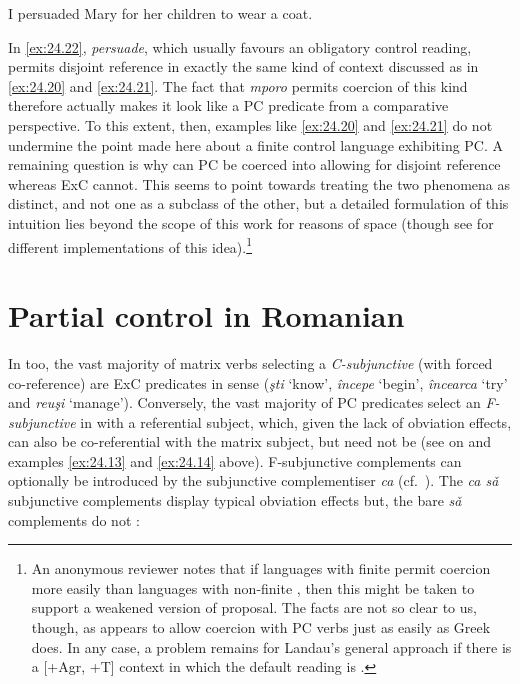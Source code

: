 \documentclass[output=paper]{langsci/langscibook}
\begin{document}
\ea%
    \label{ex:24.22}
    I persuaded Mary for her children to wear a coat.
\z

In \eqref{ex:24.22}, \emph{persuade}, which usually favours an obligatory
control reading, permits disjoint reference in exactly the same kind of context
discussed as in \eqref{ex:24.20} and \eqref{ex:24.21}. The fact that
\emph{mporo} permits coercion of this kind therefore actually makes it look
like a \gls{PC} predicate from a comparative
perspective.  To this extent, then, examples like \eqref{ex:24.20} and
\eqref{ex:24.21} do not undermine the point made here about a finite
control language exhibiting PC. A remaining question is why can
\gls{PC} be coerced into allowing for disjoint
reference whereas \gls{ExC} cannot. This seems
to point towards treating the two phenomena as distinct, and not one as a
subclass of the other, but a detailed formulation of this intuition lies beyond
the scope of this work for reasons of space (though see
\citealt{Cinque2006,Landau2000,Landau2008,Landau2015,Sheehan2018b} for
different implementations of this idea).\footnote{An anonymous reviewer notes
    that if languages with finite  permit coercion more easily than
    languages with non-finite , then this might be taken to support a
    weakened version of  proposal. The facts are not so
    clear to us, though, as  appears to allow coercion with
\gls{PC} verbs just as easily as Greek does. In any
case, a problem remains for Landau’s general approach if there is a [+Agr, +T]
context in which the default reading is .}

\section{Partial control in Romanian}\label{sec:24.4}

In  too, the vast majority of matrix verbs selecting a
\emph{C-subjunctive} (with forced co-reference) are
\gls{ExC} predicates in 
sense (\emph{şti} ‘know’, \emph{începe} ‘begin’, \emph{încearca} ‘try’ and
\emph{reuş}\emph{i} ‘manage’). Conversely, the vast majority of
\gls{PC} predicates select an \emph{F-subjunctive}
in  with a referential subject, which, given the lack of obviation
effects, can also be co-referential with the matrix subject, but need not be
(see \citealt{Alboiu2007,AlexiadouEtAl2010,Hill2012,Nicolae2013}
on  and examples \eqref{ex:24.13} and \eqref{ex:24.14}
above). F-subjunctive complements can optionally be introduced by the
subjunctive complementiser \emph{ca} (cf.\
\citealt{GrosuHorvath1987,Hill2012}). The \emph{ca sǎ} subjunctive complements
display typical \ili{Romance} obviation effects but, the bare \emph{sǎ} complements
do not \citep{AlexiadouEtAl2010}:
\end{document}
